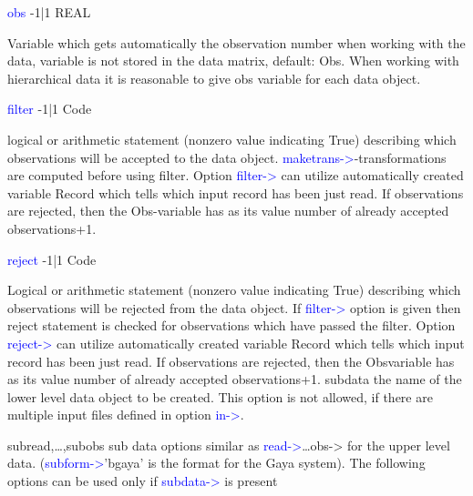 \vspace{0.3cm}
\hline
\vspace{0.3cm}
\noindent \textcolor{blue}{obs} \tabto{3cm} -1|1 \tabto{5cm}  REAL \tabto{7cm}
\begin{changemargin}{3cm}{0cm}
\noindent  Variable which gets automatically the observation number when working with the
data, variable is not stored in the data matrix, default: Obs. When working with
hierarchical data it is reasonable to give obs variable for each data object.

\end{changemargin}
\vspace{0.3cm}
\hline
\vspace{0.3cm}
\noindent \textcolor{blue}{filter} \tabto{3cm} -1|1 \tabto{5cm}  Code \tabto{7cm}
\begin{changemargin}{3cm}{0cm}
\noindent  logical or arithmetic statement (nonzero value indicating True) describing which
observations will be accepted to the data object. \textcolor{blue}{maketrans->}-transformations are
computed before using filter. Option \textcolor{blue}{filter->} can utilize automatically created
variable Record which tells which input record has been just read. If observations
are rejected, then the Obs-variable has as its value number of already accepted
observations+1.

\end{changemargin}
\vspace{0.3cm}
\hline
\vspace{0.3cm}
\noindent \textcolor{blue}{reject}  \tabto{3cm} -1|1 \tabto{5cm}  Code \tabto{7cm}
\begin{changemargin}{3cm}{0cm}
\noindent  Logical or arithmetic statement (nonzero value indicating True) describing which
observations will be rejected from the data object. If \textcolor{blue}{filter->} option is given then
reject statement is checked for observations which have passed the filter. Option
\textcolor{blue}{reject->} can utilize automatically created variable Record which tells which
input record has been just read. If observations are rejected, then the Obsvariable has as its value number of already accepted observations+1.
subdata the name of the lower level data object to be created. This option is not allowed, if
there are multiple input files defined in option \textcolor{blue}{in->}.

subread,…,subobs sub data options similar as \textcolor{blue}{read->}…obs-> for the upper level data.
(\textcolor{blue}{subform->}'bgaya' is the format for the Gaya system). The following options
can be used only if \textcolor{blue}{subdata->} is present

\end{changemargin}
